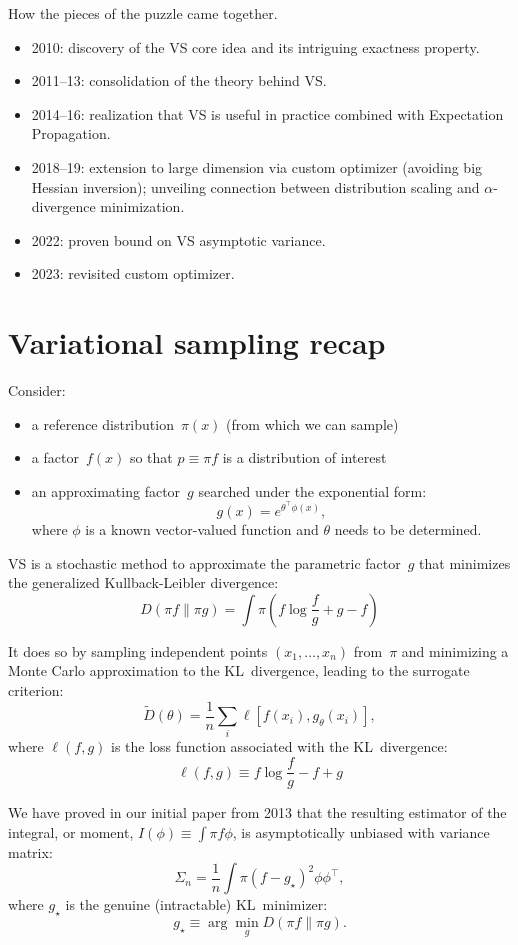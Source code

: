 \documentclass{article}
\begin{document}
How the pieces of the puzzle came together.
\begin{itemize}
\item 2010: discovery of the VS core idea and its intriguing exactness property.
\item 2011--13: consolidation of the theory behind VS.
\item 2014--16: realization that VS is useful in practice combined with Expectation Propagation.
\item 2018--19: extension to large dimension via custom optimizer (avoiding big Hessian inversion); unveiling connection between distribution scaling and $\alpha$-divergence minimization.
\item 2022: proven bound on VS asymptotic variance.
\item 2023: revisited custom optimizer.
\end{itemize}


\section{Variational sampling recap}

Consider:
\begin{itemize}
\item a reference distribution~$\pi(x)$ (from which we can sample)
\item a factor~$f(x)$ so that $p\equiv \pi f$ is a distribution of interest
\item an approximating factor~$g$ searched under the exponential form:
  $$
  g(x) = e^{\theta^\top \phi(x)},
  $$ where $\phi$ is a known vector-valued function and $\theta$ needs
  to be determined.
\end{itemize}

VS is a stochastic method to approximate the parametric factor~$g$ that minimizes the generalized Kullback-Leibler divergence:
$$
D(\pi f\|\pi g)
= \int \pi (f \log \frac{f}{g} + g - f)
$$

It does so by sampling independent points $(x_1,\ldots,x_n)$ from~$\pi$ and minimizing a Monte Carlo approximation to the KL~divergence, leading to the surrogate criterion:
$$
\tilde{D}(\theta) = \frac{1}{n} \sum_i \ell[ f(x_i), g_\theta(x_i) ],
$$
where $\ell(f, g)$ is the loss function associated with the KL~divergence:
$$
\ell(f, g) \equiv f \log \frac{f}{g} - f + g
$$
  
We have proved in our initial paper from 2013 that the resulting estimator of the integral, or moment, $I(\phi) \equiv \int \pi f \phi$, is asymptotically unbiased with variance matrix:
$$
\Sigma_n = \frac{1}{n} \int \pi (f - g_\star)^2 \phi \phi^\top,
$$
where $g_\star$ is the genuine (intractable) KL~minimizer:
$$
g_\star \equiv \arg\min_g D(\pi f\|\pi g).
$$
\end{document}
